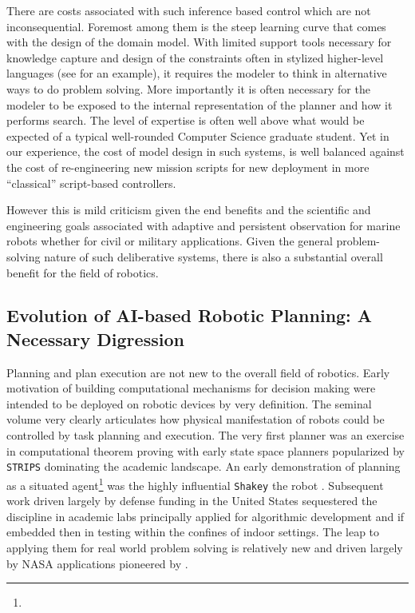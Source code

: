 There are costs associated with such inference based control which are
not inconsequential. Foremost among them is the steep learning curve
that comes with the design of the domain model. With limited support
tools necessary for knowledge capture and design of the constraints
often in stylized higher-level languages (see \cite{NDDL} for an
example), it requires the modeler to think in alternative ways to do
problem solving. More importantly it is often necessary for the
modeler to be exposed to the internal representation of the planner
and how it performs search. The level of expertise is often well above
what would be expected of a typical well-rounded Computer Science
graduate student. Yet in our experience, the cost of model design in
such systems, is well balanced against the cost of re-engineering new
mission scripts for new deployment in more ``classical'' script-based
controllers.

However this is mild criticism given the end benefits and the
scientific and engineering goals associated with adaptive and
persistent observation for marine robots whether for civil or military
applications. Given the general problem-solving nature of such
deliberative systems, there is also a substantial overall benefit for
the field of robotics.

\subsection{Evolution of AI-based Robotic Planning: A Necessary Digression}
\label{sec:related:robotplans}

Planning and plan execution are not new to the overall field of
robotics. Early motivation of building computational mechanisms for
decision making were intended to be deployed on robotic devices by
very definition. The seminal volume \cite{computersthought} very
clearly articulates how physical manifestation of robots could be
controlled by task planning and execution. The very first planner
\cite{green69} was an exercise in computational theorem proving with
early state space planners popularized by \texttt{STRIPS}
\cite{strips71} dominating the academic landscape. An early
demonstration of planning as a situated agent\footnote{} was the highly influential \texttt{Shakey} the
robot \cite{shakey84}. Subsequent work driven largely by defense
funding in the United States sequestered the discipline in academic
labs principally applied for algorithmic development and if embedded
then in testing within the confines of  indoor
settings. The leap to applying them for real world problem solving is
relatively new and driven largely by NASA applications pioneered by
\cite{mus94,mus98, jonsson00, rajan00, chien05, bresina05}.

